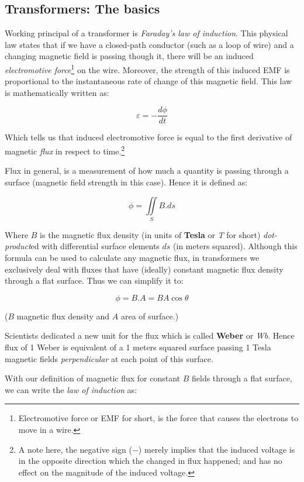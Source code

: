 \documentclass{article}
\begin{document}
	\subsection{Transformers: The basics}
	Working principal of a transformer is \textit{Faraday's law of induction}. This physical law states that if we have a closed-path conductor (such as a loop of wire) and a changing magnetic field is passing though it, there will be an induced \textit{electromotive force}\footnote{Electromotive force or EMF for short, is the force that causes the electrons to move in a wire.} on the wire. Moreover, the strength of this induced EMF  is proportional to the instantaneous rate of change of this magnetic field.	
	This law is mathematically written as:

	$$ \varepsilon = - \frac{d \phi}{dt} $$

	Which tells us that induced electromotive force is equal to the first derivative of magnetic \textit{flux} in respect to time.\footnote[1]{A note here, the negative sign ($-$) merely implies that the induced voltage is in the opposite direction which the changed in flux happened; and has no effect on the magnitude of the induced voltage.}
	
	Flux in general, is a measurement of how much a quantity is passing through a surface (magnetic field strength in this case).
	Hence it is defined as:
	
	$$ \phi = \iint\limits_S B.ds$$
	
	Where $B$ is the magnetic flux density (in units of \textbf{Tesla} or \textit{T} for short) \textit{dot-product}ed with differential surface elements $ds$ (in meters squared).
	Although this formula can be used to calculate any magnetic flux, in transformers we exclusively deal with fluxes that have (ideally) constant magnetic flux density through a flat surface.
	Thus we can simplify it to:
	
	$$ \phi = B.A = BA\cos \theta$$
	
	($B$ magnetic flux density and $A$ area of surface.)
	
	Scientists dedicated a new unit for the flux which is called \textbf{Weber} or \textit{Wb}.
	Hence flux of 1 Weber is equivalent of a 1 meters squared surface passing 1 Tesla magnetic fields \textit{perpendicular} at each point of this surface.
	
	
	With our definition of magnetic flux for constant $B$ fields through a flat surface, we can write the \textit{law of induction} as:
\end{document}
